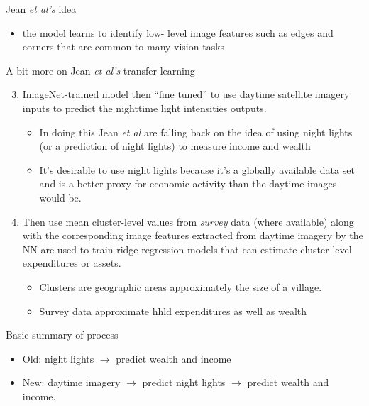\documentclass[mathserif]{beamer}
\begin{document}
\begin{frame}{Jean \textit{et al's} idea}
\begin{enumerate}
\begin{itemize}
\item the model learns to identify low- level image features such as edges and corners that are common to many vision tasks
\end{itemize}
\end{enumerate}
\end{frame}

\begin{frame}{A bit more on Jean \textit{et al's} transfer learning}
\begin{enumerate}
 \setcounter{enumi}{2}
\item ImageNet-trained model then ``fine tuned'' to use daytime satellite imagery inputs to predict the nighttime light intensities outputs.
\begin{itemize}
\item In doing this Jean\textit{ et al} are falling back on the idea of using night lights (or a prediction of night lights) to measure income and wealth
\item It's desirable to use night lights because it's a globally available data set and is a better proxy for economic activity than the daytime images would be.
\end{itemize}
\item Then use mean cluster-level values from \textit{survey} data (where available) along with the corresponding image features extracted from daytime imagery by the NN are used to train ridge regression models that can estimate cluster-level expenditures or assets.
\begin{itemize}
\item Clusters are geographic areas approximately the size of a village.
\item Survey data approximate hhld expenditures as well as wealth 
\end{itemize}
\end{enumerate}
\end{frame}

\begin{frame}{Basic summary of process}

\begin{itemize}
\item Old: night lights $\rightarrow $ predict wealth and income
\item New: daytime imagery $\rightarrow$ predict night lights $\rightarrow$ predict wealth and income.
\end{itemize}

\end{frame}
\end{document}
